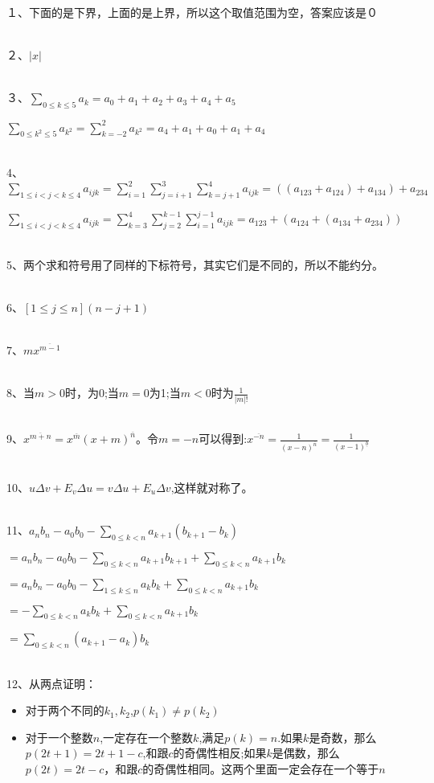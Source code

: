 \documentclass[onecolumn]{article}
\begin{document}
１、下面的是下界，上面的是上界，所以这个取值范围为空，答案应该是０ \par
~\\
２、$|x|$ \par
~\\
３、$\sum_{0\leq k\leq 5}a_{k}=a_{0}+a_{1}+a_{2}+a_{3}+a_{4}+a_{5}$ \par
$\sum_{0\leq k^{2}\leq 5}a_{k^{2}}=\sum_{k=-2}^{2}a_{k^{2}}=a_{4}+a_{1}+a_{0}+a_{1}+a_{4}$ \par
~\\
4、$\sum_{1\leq i<j<k\leq 4}a_{ijk}=\sum_{i=1}^{2}\sum_{j=i+1}^{3}\sum_{k=j+1}^{4}a_{ijk}=((a_{123}+a_{124})+a_{134})+a_{234}$\par

$\sum_{1\leq i<j<k\leq 4}a_{ijk}=\sum_{k=3}^{4}\sum_{j=2}^{k-1}\sum_{i=1}^{j-1}a_{ijk}=a_{123}+(a_{124}+(a_{134}+a_{234}))$\par
~\\
5、两个求和符号用了同样的下标符号，其实它们是不同的，所以不能约分。\par
~\\
6、$[1\leq j\leq n](n-j+1)$\par
~\\
7、$mx^{\overline{m-1}}$\par
~\\
8、当$m>0$时，为0;当$m=0$为1;当$m<0$时为$\frac{1}{|m|!}$\par
~\\
9、$x^{\overline{m+n}}=x^{\overline{m}}(x+m)^{\overline{n}}$。令$m=-n$可以得到:$x^{\overline{-n}}=\frac{1}{(x-n)^{\overline{n}}}=\frac{1}{(x-1)^{\underline{b}}}$ \par
~\\
10、$u\Delta v+E_{v}\Delta u=v\Delta u+E_{u}\Delta v$,这样就对称了。\par
~\\
11、$a_{n}b_{n}-a_{0}b_{0}-\sum_{0\leq k < n}a_{k+1}(b_{k+1}-b_{k})$\par
$=a_{n}b_{n}-a_{0}b_{0}-\sum_{0\leq k < n}a_{k+1}b_{k+1}+\sum_{0\leq k < n}a_{k+1}b_{k}$\par
$=a_{n}b_{n}-a_{0}b_{0}-\sum_{1\leq k \leq n}a_{k}b_{k}+\sum_{0\leq k < n}a_{k+1}b_{k}$\par
$=-\sum_{0\leq k < n}a_{k}b_{k}+\sum_{0\leq k < n}a_{k+1}b_{k}$\par
$=\sum_{0\leq k < n}(a_{k+1}-a_{k})b_{k}$\par
~\\
12、从两点证明：\par
\begin{itemize}
	\item 对于两个不同的$k_{1},k_{2}$,$p(k_{1})\ne p(k_{2})$
	\item 对于一个整数$n$,一定存在一个整数$k$,满足$p(k)=n$.如果$k$是奇数，那么$p(2t+1)=2t+1-c$,和跟$c$的奇偶性相反;如果$k$是偶数，那么$p(2t)=2t-c$，和跟$c$的奇偶性相同。这两个里面一定会存在一个等于$n$
\end{itemize}
\end{document}
